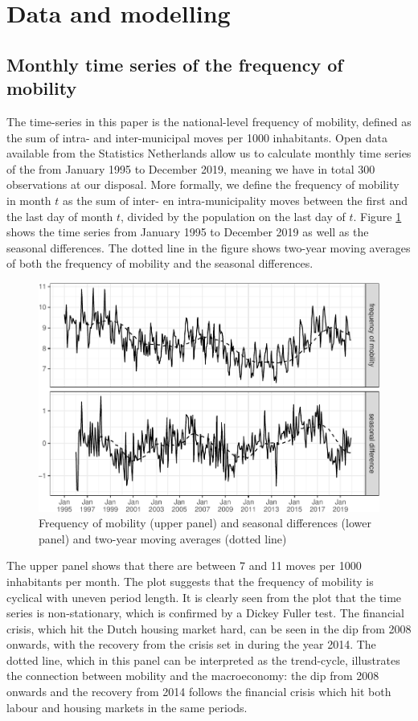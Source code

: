 \documentclass[12pt, a4paper]{article}
\begin{document}
\section{Data and modelling}\label{data}
\subsection{Monthly time series of the frequency of mobility}\label{monthly-time-series-of-the-frequency-of-mobility}

The time-series in this paper is the national-level frequency of
mobility, defined as the sum of intra- and inter-municipal moves per
1000 inhabitants. Open data available from the Statistics Netherlands
allow us to calculate monthly time series of the from January 1995 to
December 2019, meaning we have in total 300 observations at our
disposal. More formally, we define the frequency of mobility
in month $t$ as the sum of inter- en intra-municipality moves between the
first and the last day of month $t$, divided by the population on the
last day of $t$. Figure \ref{fig:freq-plot} shows the time series from January
1995 to December 2019 as well as the seasonal differences. The dotted line in the figure shows
two-year moving averages of both the frequency of mobility and the
seasonal differences.

\begin{figure}[H]
\caption{\label{fig:freq-plot}Frequency of mobility (upper panel) and
seasonal differences (lower panel) and two-year moving averages (dotted
line)}
\centering
\includegraphics[scale = 0.8]{../figs/freq--freq-plot-1.pdf}
\end{figure}

The upper panel shows that there are between 7 and 11 moves per 1000
inhabitants per month. The plot suggests that the frequency of mobility
is cyclical with uneven period length. It is clearly seen from the plot that
the time series is non-stationary, which is confirmed by a Dickey Fuller test. The financial crisis, which hit the Dutch housing market hard, can
be seen in the dip from 2008 onwards, with the recovery from the crisis
set in during the year 2014. The dotted line, which in this panel can
be interpreted as the trend-cycle, illustrates the connection
between mobility and the macroeconomy: the dip from 2008 onwards and the
recovery from 2014 follows the financial crisis which hit both labour
and housing markets in the same periods.
\end{document}
